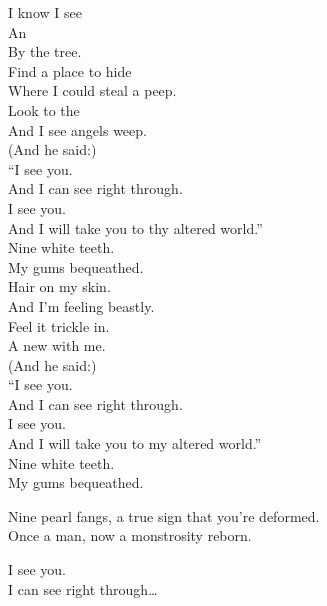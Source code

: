 



I know I see \\
An   \\
By the tree. \\

Find a place to hide \\
Where I could steal a peep. \\
Look to the  \\
And I see angels weep. \\

(And he said:) \\
``I see you. \\
And I can see right through. \\
I see you. \\
And I will take you to thy altered world.'' \\

Nine white teeth. \\
My gums bequeathed. \\

Hair on my skin. \\
And I'm feeling beastly. \\
Feel it trickle in. \\
A new  with me. \\

(And he said:) \\
``I see you. \\
And I can see right through. \\
I see you. \\
And I will take you to my altered world.'' \\

Nine white teeth. \\
My gums bequeathed. \\


Nine pearl fangs, a true sign that you're deformed. \\
Once a man, now a monstrosity reborn. \\


I see you. \\
I can see right through… \\


